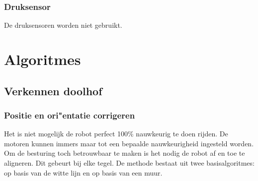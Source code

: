 \documentclass[tt3]{penoverslag}
\begin{document}


\subsubsection{Druksensor}
De druksensoren worden niet gebruikt.

\section{Algoritmes}
\label{sec:Algo}

\subsection{Verkennen doolhof}
\label{ssec: verkenDool}
\subsubsection{Positie en ori"entatie corrigeren}
\label{ssec:AlgoAllign}
Het is niet mogelijk de robot perfect 100\% nauwkeurig te doen rijden. De motoren kunnen immers maar tot een bepaalde nauwkeurigheid ingesteld worden. Om de besturing toch betrouwbaar te maken is het nodig de robot af en toe te aligneren. Dit gebeurt bij elke tegel. %
De methode bestaat uit twee basisalgoritmes: op basis van de witte lijn en op basis van een muur.
\end{document}
